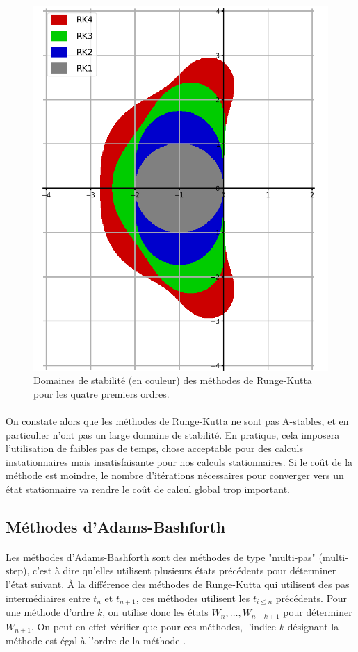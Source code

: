    \begin{figure}
      \centering
      \includegraphics[width=.5\textwidth]{images/rk_stab.png}
      \caption{Domaines de stabilité (en couleur) des méthodes de Runge-Kutta pour les quatre premiers ordres.}
      \label{fig:rk_stab}
    \end{figure}

    \paragraph{}
    On constate alors que les méthodes de Runge-Kutta ne sont pas A-stables, et en particulier n'ont pas un large domaine de stabilité.
    En pratique, cela imposera l'utilisation de faibles pas de temps, chose acceptable pour des calculs instationnaires mais insatisfaisante pour nos calculs stationnaires.
    Si le coût de la méthode est moindre, le nombre d'itérations nécessaires pour converger vers un état stationnaire va rendre le coût de calcul global trop important.


  \subsection{Méthodes d'Adams-Bashforth}

    \paragraph{}
    Les méthodes d'Adams-Bashforth sont des méthodes de type "multi-pas" (multi-step), c'est à dire qu'elles utilisent plusieurs états précédents pour déterminer l'état suivant.
    À la différence des méthodes de Runge-Kutta qui utilisent des pas intermédiaires entre $t_n$ et $t_{n+1}$, ces méthodes utilisent les $t_{i\leq n}$ précédents.
    Pour une méthode d'ordre $k$, on utilise donc les états $W_n, \dots, W_{n-k+1}$ pour déterminer $W_{n+1}$.
    On peut en effet vérifier que pour ces méthodes, l'indice $k$ désignant la méthode est égal à l'ordre de la méthode .

